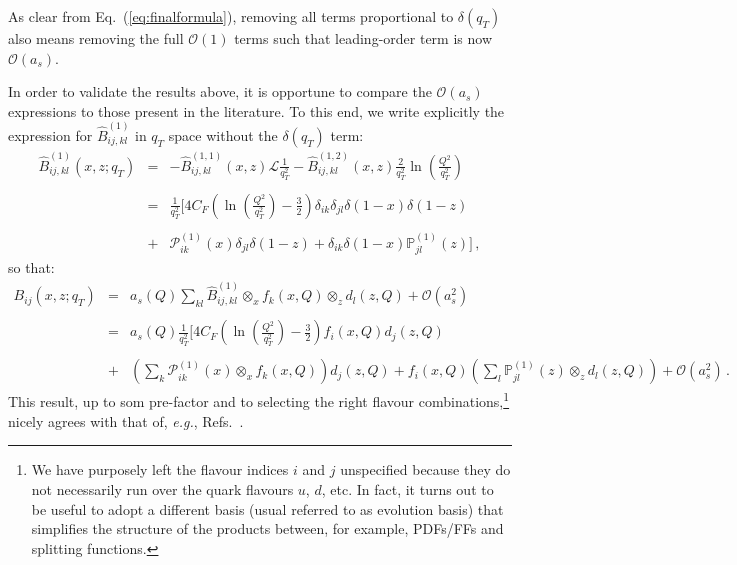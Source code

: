 \documentclass[10pt,a4paper]{article}
\begin{document}
As clear from Eq.~(\ref{eq:finalformula}), removing all terms
proportional to $\delta(q_T)$ also means removing the full
$\mathcal{O}(1)$ terms such that leading-order term is now
$\mathcal{O}(a_s)$.

In order to validate the results above, it is opportune to compare the
$\mathcal{O}(a_s)$ expressions to those present in the literature. To
this end, we write explicitly the expression for
$\hat{B}_{ij,kl}^{(1)}$ in $q_T$ space without the $\delta(q_T)$ term:
\begin{equation}
\begin{array}{rcl}
\hat{B}_{ij,kl}^{(1)}(x,z;q_T) &=&\displaystyle 
-\hat{B}_{ij,kl}^{(1,1)}(x,z)\mathcal{L}\frac{1}{q_T^2}
  -\hat{B}_{ij,kl}^{(1,2)}(x,z)\frac{2}{q_T^2}\ln\left(\frac{Q^2}{q_T^2}\right)\\
\\
 &=&\displaystyle
     \frac{1}{q_T^2}\bigg[4C_F\left(\ln\left(\frac{Q^2}{q_T^2}\right)-\frac{3}{2}\right)\delta_{ik}\delta_{jl}\delta(1-x)\delta(1-z)\\
\\
 &+&\displaystyle \mathcal{P}_{ik}^{(1)}(x)\delta_{jl}\delta(1-z) + \delta_{ik}\delta(1-x)\mathbb{P}_{jl}^{(1)}(z)\bigg]\,,
\end{array}
\end{equation}
so that:
\begin{equation}\label{eq:asymptfromres}
\begin{array}{rcl}
B_{ij}(x,z;q_T) &=&\displaystyle a_s(Q) \sum_{kl}\hat{B}_{ij,kl}^{(1)}\mathop{\otimes}_x
  f_k(x,Q)\mathop{\otimes}_zd_l(z,Q)+\mathcal{O}(a_s^2)\\
\\
&=&\displaystyle a_s(Q) \frac{1}{q_T^2}\bigg[4C_F\left(\ln\left(\frac{Q^2}{q_T^2}\right)-\frac{3}{2}\right) f_i(x,Q)d_j(z,Q)\\
\\
 &+&\displaystyle \left(\sum_{k}\mathcal{P}_{ik}^{(1)}(x) \mathop{\otimes}_x
  f_k(x,Q)\right)d_j(z,Q) + f_i(x,Q)\left(\sum_l\mathbb{P}_{jl}^{(1)}(z) \mathop{\otimes}_zd_l(z,Q)\right) +\mathcal{O}(a_s^2)\,.
\end{array}
\end{equation}
This result, up to som pre-factor and to selecting the right flavour
combinations,\footnote{We have purposely left the flavour indices $i$
  and $j$ unspecified because they do not necessarily run over the
  quark flavours $u$, $d$, etc. In fact, it turns out to be useful to
  adopt a different basis (usual referred to as evolution basis) that
  simplifies the structure of the products between, for example,
  PDFs/FFs and splitting functions.} nicely agrees with that of,
\textit{e.g.},
Refs.~\cite{Meng:1995yn,Nadolsky:1999kb,Collins:2016hqq}.
\end{document}
